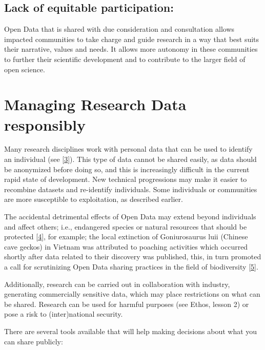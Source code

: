 \documentclass[
  letterpaper,
  DIV=11,
  numbers=noendperiod]{scrreport}
\begin{document}
\hypertarget{lack-of-equitable-participation}{%
\subsection{Lack of equitable
participation:}\label{lack-of-equitable-participation}}

Open Data that is shared with due consideration and consultation allows
impacted communities to take charge and guide research in a way that
best suits their narrative, values and needs. It allows more autonomy in
these communities to further their scientific development and to
contribute to the larger field of open science.

\hypertarget{managing-research-data-responsibly}{%
\section{Managing Research Data
responsibly}\label{managing-research-data-responsibly}}

Many research disciplines work with personal data that can be used to
identify an individual (see
{[}\href{https://the-turing-way.netlify.app/reproducible-research/rdm/rdm-personal.html}{3}{]}).
This type of data cannot be shared easily, as data should be anonymized
before doing so, and this is increasingly difficult in the current rapid
state of development. New technical progressions may make it easier to
recombine datasets and re-identify individuals. Some individuals or
communities are more susceptible to exploitation, as described earlier.

The accidental detrimental effects of Open Data may extend beyond
individuals and affect others; i.e., endangered species or natural
resources that should be protected
{[}\href{https://doi.org/10.1038/s41559-018-0608-1}{4}{]}, for example;
the local extinction of Goniurosaurus luii (Chinese cave geckos) in
Vietnam was attributed to poaching activities which occurred shortly
after data related to their discovery was published, this, in turn
promoted a call for scrutinizing Open Data sharing practices in the
field of biodiversity
{[}\href{https://doi.org/10.1126/science.aan1362}{5}{]}.

Additionally, research can be carried out in collaboration with
industry, generating commercially sensitive data, which may place
restrictions on what can be shared. Research can be used for harmful
purposes (see Ethos, lesson 2) or pose a risk to (inter)national
security.

There are several tools available that will help making decisions about
what you can share publicly:
\end{document}
